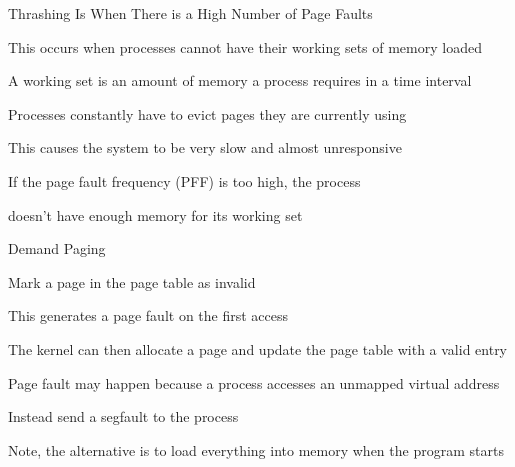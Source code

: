   \begin{frame}{Thrashing Is When There is a High Number of Page Faults}

    This occurs when processes cannot have their working sets of memory loaded

    \hspace{2em} A working set is an amount of memory a process requires in a
                 time interval

    \vspace{2em}

    Processes constantly have to evict pages they are currently using

    \vspace{2em}

    This causes the system to be very slow and almost unresponsive

    \vspace{2em}

    If the page fault frequency (PFF) is too high, the process
    
    doesn't have enough memory for its working set
  \end{frame}
  
  \begin{frame}{Demand Paging}

    Mark a page in the page table as invalid

    \hspace{2em} This generates a page fault on the first access

    \vspace{2em}

    The kernel can then allocate a page and update the page table with a valid
    entry

    \vspace{2em}

    Page fault may happen because a process accesses an unmapped
    virtual address

    \hspace{2em} Instead send a segfault to the process

    \vspace{2em}

    Note, the alternative is to load everything into memory when the program
    starts
  \end{frame}

